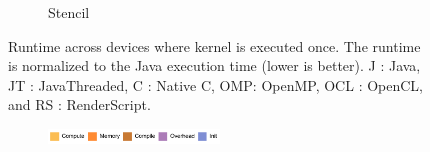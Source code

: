 \begin{figure}
\begin{subfigure}[b]{0.33\textwidth}
      \caption{Stencil}
  \end{subfigure}
  \caption{Runtime across devices where kernel is executed once. The runtime is normalized to the Java execution time (lower is better). J : Java, JT : JavaThreaded, C : Native C, OMP: OpenMP, OCL : OpenCL, and RS : RenderScript.}
  \label{fig:perfOne}
\end{figure}

\begin{figure}

  \centering
  \begin{subfigure}[b]{\textwidth}
          \centering
          \includegraphics[width=0.5\textwidth]{data/legend.pdf}
  \end{subfigure}


\end{figure}
